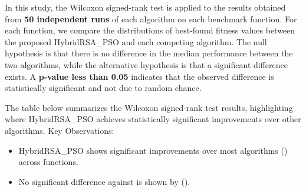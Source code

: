 \documentclass[12pt]{article}
\begin{document}
In this study, the Wilcoxon signed-rank test is applied to the results obtained from \textbf{50 independent runs} of each algorithm on each benchmark function. For each function, we compare the distributions of best-found fitness values between the proposed HybridRSA\_PSO and each competing algorithm. The null hypothesis is that there is no difference in the median performance between the two algorithms, while the alternative hypothesis is that a significant difference exists. A \textbf{p-value less than 0.05} indicates that the observed difference is statistically significant and not due to random chance.

The table below summarizes the Wilcoxon signed-rank test results, highlighting where HybridRSA\_PSO achieves statistically significant improvements over other algorithms.
Key Observations:
\begin{itemize}
    \item HybridRSA\_PSO shows significant improvements over most algorithms (\checkmark) across functions.
    
    \item No significant difference against is shown by (\texttimes).
\end{itemize}
\end{document}
